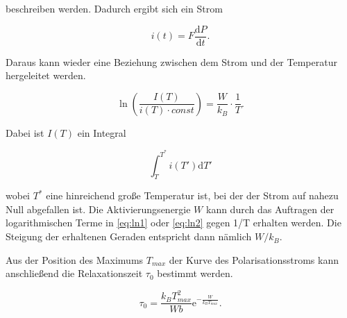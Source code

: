 beschreiben werden.
Dadurch ergibt sich ein Strom

\begin{equation}
  i(t) = F \frac{\mathrm{d} P}{\mathrm{d} t} .
\end{equation}

Daraus kann wieder eine Beziehung zwischen dem Strom und der Temperatur hergeleitet werden.

\begin{equation}
	\ln\left(\frac{I(T)}{i(T) \cdot const}\right) = \frac{W}{k_B} \cdot \frac{1}{T} \label{eq:ln2} .
\end{equation}

Dabei ist $I(T)$ ein Integral

\begin{equation}
	\int_{T}^{T^*} i(T') \mathrm{d}T'
\end{equation}

wobei $T^*$ eine hinreichend große Temperatur ist, bei der der Strom auf nahezu Null abgefallen ist.
Die Aktivierungsenergie $W$ kann durch das Auftragen der logarithmischen Terme in \eqref{eq:ln1} oder \eqref{eq:ln2} gegen
1/T erhalten werden. Die Steigung der erhaltenen Geraden entspricht dann nämlich $W/k_B$.

Aus der Position des Maximums $T_{max}$ der Kurve des Polarisationsstroms kann anschließend die Relaxationszeit $\tau_0$
bestimmt werden.

\begin{equation}
	\tau_0 = \frac{k_B T^2_{max}}{W b} \mathrm{e}^{-\frac{W}{k_B T_{max}}} .
	\label{eq:tau_0}
\end{equation}
